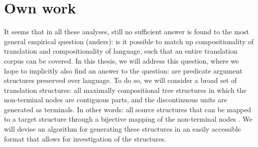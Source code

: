 \documentclass{report}
\begin{document}
\tableofcontents


%




 
%

 
% 












\chapter{Own work}

It seems that in all these analyses, still no sufficient answer is found to the most general empirical question (anders): is it possible to match up compositionality of translation and compositionality of language, such that an entire translation corpus can be covered. In this thesis, we will address this question, where we hope to implicitly also find an answer to the question: are predicate argument structures preserved over language. To do so, we will consider a broad set of translation structures: all maximally compositional tree structures in which the non-terminal nodes are contiguous parts, and the discontinuous units are generated as terminals. In other words: all source structures that can be mapped to a target structure through a bijective mapping of the non-terminal nodes \citep[this set was previously defined in][]{simaan2013hats}. We will devise an algorithm for generating these structures in an easily accessible format that allows for investigation of the structures.
\end{document}
